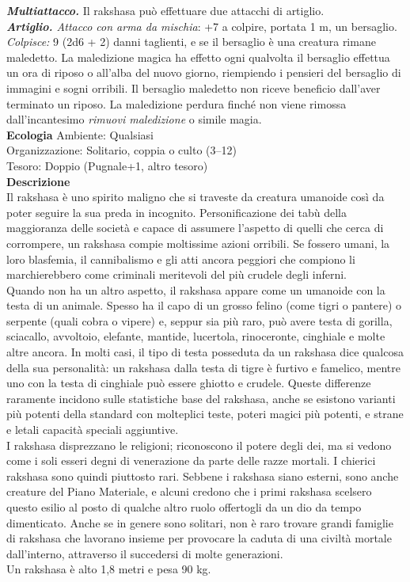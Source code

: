 \begin{multicols}{2}
\emph{\textbf{Multiattacco.}} Il rakshasa può effettuare due attacchi di artiglio.\\
\emph{\textbf{Artiglio.} Attacco con arma da mischia}: +7 a colpire, portata 1 m, un bersaglio.\\
\emph{Colpisce:} 9 (2d6 + 2) danni taglienti, e se il bersaglio è una creatura rimane maledetto. La maledizione magica ha effetto ogni qualvolta il bersaglio effettua un ora di riposo o all'alba del nuovo giorno, riempiendo i pensieri del bersaglio di immagini e sogni orribili. Il bersaglio maledetto non riceve beneficio dall'aver terminato un riposo. La maledizione perdura finché non viene rimossa dall'incantesimo \emph{rimuovi maledizione} o simile magia.\\
\textbf{Ecologia}
Ambiente: Qualsiasi\\
Organizzazione: Solitario, coppia o culto (3–12)\\
Tesoro: Doppio (Pugnale+1, altro tesoro)\\
\textbf{Descrizione}\\
Il rakshasa è uno spirito maligno che si traveste da creatura umanoide così da poter seguire la sua preda in incognito. Personificazione dei tabù della maggioranza delle società e capace di assumere l’aspetto di quelli che cerca di corrompere, un rakshasa compie moltissime azioni orribili. Se fossero umani, la loro blasfemia, il cannibalismo e gli atti ancora peggiori che compiono li marchierebbero come criminali meritevoli del più crudele degli inferni.\\
Quando non ha un altro aspetto, il rakshasa appare come un umanoide con la testa di un animale. Spesso ha il capo di un grosso felino (come tigri o pantere) o serpente (quali cobra o vipere) e, seppur sia più raro, può avere testa di gorilla, sciacallo, avvoltoio, elefante, mantide, lucertola, rinoceronte, cinghiale e molte altre ancora. In molti casi, il tipo di testa posseduta da un rakshasa dice qualcosa della sua personalità: un rakshasa dalla testa di tigre è furtivo e famelico, mentre uno con la testa di cinghiale può essere ghiotto e crudele. Queste differenze raramente incidono sulle statistiche base del rakshasa, anche se esistono varianti più potenti della standard con molteplici teste, poteri magici più potenti, e strane e letali capacità speciali aggiuntive.\\
I rakshasa disprezzano le religioni; riconoscono il potere degli dei, ma si vedono come i soli esseri degni di venerazione da parte delle razze mortali. I chierici rakshasa sono quindi piuttosto rari. Sebbene i rakshasa siano esterni, sono anche creature del Piano Materiale, e alcuni credono che i primi rakshasa scelsero questo esilio al posto di qualche altro ruolo offertogli da un dio da tempo dimenticato. Anche se in genere sono solitari, non è raro trovare grandi famiglie di rakshasa che lavorano insieme per provocare la caduta di una civiltà mortale dall'interno, attraverso il succedersi di molte generazioni.\\
Un rakshasa è alto 1,8 metri e pesa 90 kg.\\


\end{multicols}
